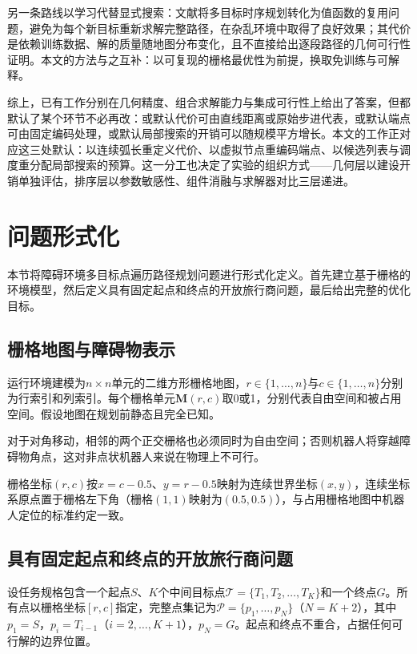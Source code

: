 \documentclass[lettersize,journal]{IEEEtran}
\begin{document}
另一条路线以学习代替显式搜索：文献\cite{ref47}将多目标时序规划转化为值函数的复用问题，避免为每个新目标重新求解完整路径，在杂乱环境中取得了良好效果；其代价是依赖训练数据、解的质量随地图分布变化，且不直接给出逐段路径的几何可行性证明。本文的方法与之互补：以可复现的栅格最优性为前提，换取免训练与可解释。

综上，已有工作分别在几何精度、组合求解能力与集成可行性上给出了答案，但都默认了某个环节不必再改：或默认代价可由直线距离或原始步进代表，或默认端点可由固定编码处理，或默认局部搜索的开销可以随规模平方增长。本文的工作正对应这三处默认：以连续弧长重定义代价、以虚拟节点重编码端点、以候选列表与调度重分配局部搜索的预算。这一分工也决定了实验的组织方式——几何层以建设开销单独评估，排序层以参数敏感性、组件消融与求解器对比三层递进。

\section{问题形式化}

\label{sec:form}

本节将障碍环境多目标点遍历路径规划问题进行形式化定义。首先建立基于栅格的环境模型，然后定义具有固定起点和终点的开放旅行商问题，最后给出完整的优化目标。

\subsection{栅格地图与障碍物表示}

运行环境建模为$n \times n$单元的二维方形栅格地图，$r \in \{1, \dots, n\}$与$c \in \{1, \dots, n\}$分别为行索引和列索引。每个栅格单元$\mathbf{M}(r, c)$取0或1，分别代表自由空间和被占用空间。假设地图在规划前静态且完全已知。

对于对角移动，相邻的两个正交栅格也必须同时为自由空间；否则机器人将穿越障碍物角点，这对非点状机器人来说在物理上不可行。

栅格坐标$(r, c)$按$x = c - 0.5$、$y = r - 0.5$映射为连续世界坐标$(x, y)$，连续坐标系原点置于栅格左下角（栅格$(1,1)$映射为$(0.5, 0.5)$），与占用栅格地图中机器人定位的标准约定一致。

\subsection{具有固定起点和终点的开放旅行商问题}

\label{subsec:otspp}

设任务规格包含一个起点$S$、$K$个中间目标点$\mathcal{T} = \{T_1, T_2, \dots, T_K\}$和一个终点$G$。所有点以栅格坐标$[r, c]$指定，完整点集记为$\mathcal{P} = \{p_1, \dots, p_N\}$（$N = K + 2$），其中$p_1 = S$，$p_i = T_{i-1}$（$i = 2, \dots, K+1$），$p_N = G$。起点和终点不重合，占据任何可行解的边界位置。
\end{document}
